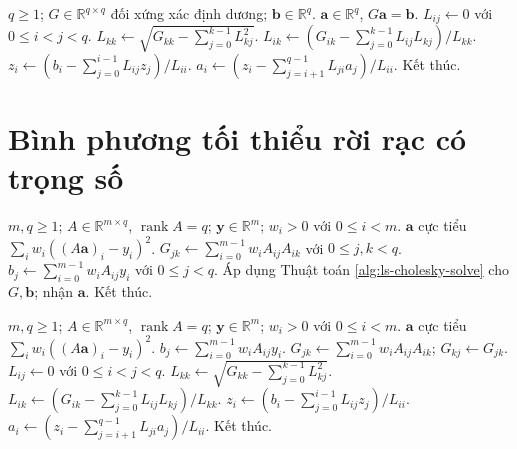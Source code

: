 \documentclass[12pt,a4paper,oneside]{book}
\numberwithin{algorithm}{chapter}
\theoremstyle{definition}
\newcommand{\R}{\mathbb{R}}
\begin{document}
\begin{algorithm}[H]
\caption{Giải hệ bằng Cholesky -- chi tiết}
\label{alg:ls-cholesky-solve-detailed}
\begin{algorithmic}[1]
\Require $q\geq1$; $G\in\R^{q\times q}$ đối xứng xác định dương; $\mathbf b\in\R^q$.
\Ensure $\mathbf a\in\R^q$, $G\mathbf a=\mathbf b$.
\State $L_{ij}\gets0$ với $0\leq i<j<q$.
  \State $L_{kk}\gets\sqrt{G_{kk}-\sum_{j=0}^{k-1}L_{kj}^2}$.
    \State $L_{ik}\gets(G_{ik}-\sum_{j=0}^{k-1}L_{ij}L_{kj})/L_{kk}$.
  \EndFor
\EndFor
\Statex
{}
  \State $z_i\gets(b_i-\sum_{j=0}^{i-1}L_{ij}z_j)/L_{ii}$.
\EndFor
\Statex
{}
  \State $a_i\gets(z_i-\sum_{j=i+1}^{q-1}L_{ji}a_j)/L_{ii}$.
\EndFor
\Statex
\State Kết thúc.
\end{algorithmic}
\end{algorithm}

\section{Bình phương tối thiểu rời rạc có trọng số}
\begin{algorithm}[H]
\caption{Giải phương trình chuẩn -- sơ lược}
\label{alg:ls-normal}
\begin{algorithmic}[1]
\Require $m,q\geq1$; $A\in\R^{m\times q}$, $\operatorname{rank}A=q$; $\mathbf y\in\R^m$; $w_i>0$ với $0\leq i<m$.
\Ensure $\mathbf a$ cực tiểu $\sum_iw_i((A\mathbf a)_i-y_i)^2$.
\State $G_{jk}\gets\sum_{i=0}^{m-1}w_iA_{ij}A_{ik}$ với $0\leq j,k<q$.
\State $b_j\gets\sum_{i=0}^{m-1}w_iA_{ij}y_i$ với $0\leq j<q$.
\State Áp dụng Thuật toán \ref{alg:ls-cholesky-solve} cho $G,\mathbf b$; nhận $\mathbf a$.
\State Kết thúc.
\end{algorithmic}
\end{algorithm}

\begin{algorithm}[H]
\caption{Giải phương trình chuẩn -- chi tiết}
\label{alg:ls-normal-detailed}
\begin{algorithmic}[1]
\Require $m,q\geq1$; $A\in\R^{m\times q}$, $\operatorname{rank}A=q$; $\mathbf y\in\R^m$; $w_i>0$ với $0\leq i<m$.
\Ensure $\mathbf a$ cực tiểu $\sum_iw_i((A\mathbf a)_i-y_i)^2$.
  \State $b_j\gets\sum_{i=0}^{m-1}w_iA_{ij}y_i$.
    \State $G_{jk}\gets\sum_{i=0}^{m-1}w_iA_{ij}A_{ik}$; $G_{kj}\gets G_{jk}$.
  \EndFor
\EndFor
\Statex
\State $L_{ij}\gets0$ với $0\leq i<j<q$.
  \State $L_{kk}\gets\sqrt{G_{kk}-\sum_{j=0}^{k-1}L_{kj}^2}$.
    \State $L_{ik}\gets(G_{ik}-\sum_{j=0}^{k-1}L_{ij}L_{kj})/L_{kk}$.
  \EndFor
\EndFor
\Statex
{}
  \State $z_i\gets(b_i-\sum_{j=0}^{i-1}L_{ij}z_j)/L_{ii}$.
\EndFor
\Statex
{}
  \State $a_i\gets(z_i-\sum_{j=i+1}^{q-1}L_{ji}a_j)/L_{ii}$.
\EndFor
\Statex
\State Kết thúc.
\end{algorithmic}
\end{algorithm}
\end{document}
